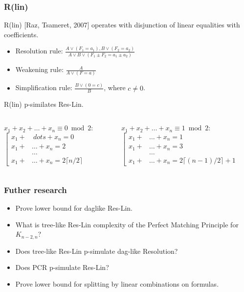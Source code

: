 \begin{frame}
    \frametitle{R(lin)}

    R(lin) [Raz, Tsameret, 2007] operates with disjunction of linear equalities with
     coefficients.
    
	\begin{itemize}
		\item Resolution rule: $\frac{A \lor (F_1 = a_1), B \lor (F_2 = a_2)}
    		{A \lor B \lor (F_1 \pm F_2 = a_1 \pm a_2)}$
		\item Weakening rule: $\frac{A}{A \lor (F = a)}$
		\item Simplification rule: $\frac{B \lor (0 = c)}{B}$, where $c \neq 0$. 
	\end{itemize}

	\pause \myth R(lin) p-similates Res-Lin.
	\medskip

	\pause
	\begin{columns}
		\begin{column}{5cm}
			$x_1 + x_2 + \dots + x_n \equiv 0 \bmod 2$:
			$\left[\begin{aligned}
            	x_1 + &\ dots + x_n = 0\\
                x_1 + &\dots + x_n = 2\\
                &\dots \\
                x_1 + &\dots + x_n = 2 \lceil n / 2 \rceil
            \end{aligned}\right.$ 
		\end{column}
		\begin{column}{5cm}
			$x_1 + x_2 + \dots + x_n \equiv 1 \bmod 2$:
			$\left[\begin{aligned}
                x_1 + &\dots + x_n = 1\\
                x_1 + &\dots + x_n = 3\\
                &\dots \\
                x_1 + &\dots + x_n = 2 \lceil (n - 1) / 2 \rceil + 1
            \end{aligned}\right.$
		\end{column}
	\end{columns}
\end{frame}


\begin{frame}
    \frametitle{Futher research}

    \begin{itemize}
		\item Prove lower bound for daglike Res-Lin.
		\item What is tree-like Res-Lin complexity of the Perfect Matching Principle
		    for $K_{n - 2, n}$? 
		\item Does tree-like Res-Lin p-simulate dag-like Resolution?
		\item Does PCR p-simulate Res-Lin?
		\item Prove lower bound for splitting by linear combinations on
		     formulas.
	\end{itemize}
\end{frame}


